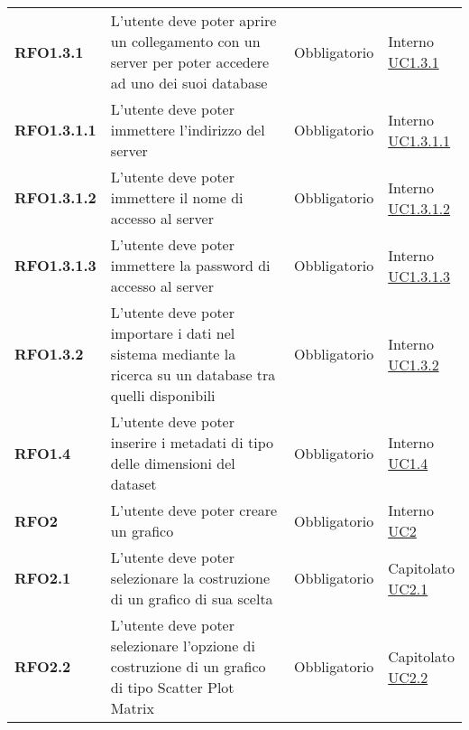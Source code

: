 \begin{longtable}[H]{>{\raggedright\bfseries}m{20mm} >{\raggedright}m{90mm} >{\raggedright}m{28mm} >{\raggedright\arraybackslash}m{30mm}}
    RFO1.3.1
    &   L'utente deve poter aprire un collegamento con un server per poter
        accedere ad uno dei suoi database
    & Obbligatorio
    & \makecell{ Interno \\  \hyperref[par:uc1.3.1]{UC1.3.1}}\\

    RFO1.3.1.1
    &   L'utente deve poter immettere l'indirizzo del server
    & Obbligatorio
    & \makecell{ Interno \\  \hyperref[spar:uc1.3.1.1]{UC1.3.1.1}}\\

    RFO1.3.1.2
    &   L'utente deve poter immettere il nome di accesso al server
    & Obbligatorio
    & \makecell{ Interno \\  \hyperref[spar:uc1.3.1.2]{UC1.3.1.2}}\\

    RFO1.3.1.3
    &   L'utente deve poter immettere la password di accesso al server
    & Obbligatorio
    & \makecell{ Interno \\  \hyperref[spar:uc1.3.1.3]{UC1.3.1.3}}\\

    RFO1.3.2
    &   L'utente deve poter importare i dati nel sistema mediante la ricerca
        su un database tra quelli disponibili
    & Obbligatorio
    & \makecell{ Interno \\ \hyperref[par:uc1.3.2]{UC1.3.2}}\\

    RFO1.4
    &   L'utente deve poter inserire i metadati di tipo delle dimensioni del dataset
    & Obbligatorio
    & \makecell{ Interno \\ \hyperref[ssub:uc1.4]{UC1.4}}\\

    RFO2
    &  L'utente deve poter creare un grafico
    & Obbligatorio
    & \makecell{ Interno \\ \hyperref[sub:uc2]{UC2}}\\

    RFO2.1
    & L'utente deve poter selezionare la costruzione di un grafico di sua scelta
    & Obbligatorio
    & \makecell{ Capitolato \\ \hyperref[ssub:uc2.1]{UC2.1}}\\

    RFO2.2
    & L'utente deve poter selezionare l'opzione di costruzione di un grafico di tipo Scatter Plot
    Matrix
    & Obbligatorio
    & \makecell{ Capitolato \\   \hyperref[ssub:uc2.2]{UC2.2}}\\


\end{longtable}
